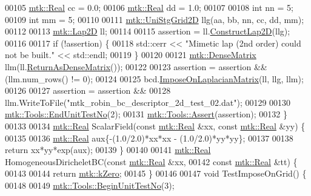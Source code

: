 \begin{DoxyCode}
00105   \hyperlink{group__c01-roots_gac080bbbf5cbb5502c9f00405f894857d}{mtk::Real} cc = 0.0;
00106   \hyperlink{group__c01-roots_gac080bbbf5cbb5502c9f00405f894857d}{mtk::Real} dd = 1.0;
00107 
00108   \textcolor{keywordtype}{int} nn = 5;
00109   \textcolor{keywordtype}{int} mm = 5;
00110 
00111   \hyperlink{classmtk_1_1UniStgGrid2D}{mtk::UniStgGrid2D} llg(aa, bb, nn, cc, dd, mm);
00112 
00113   \hyperlink{classmtk_1_1Lap2D}{mtk::Lap2D} ll;
00114 
00115   assertion = ll.\hyperlink{classmtk_1_1Lap2D_a188ee8fee643463affca7de2884711b1}{ConstructLap2D}(llg);
00116 
00117   \textcolor{keywordflow}{if} (!assertion) \{
00118     std::cerr << \textcolor{stringliteral}{"Mimetic lap (2nd order) could not be built."} << std::endl;
00119   \}
00120 
00121   \hyperlink{classmtk_1_1DenseMatrix}{mtk::DenseMatrix} llm(ll.\hyperlink{classmtk_1_1Lap2D_aaac0a22eaa2f036869b24fd420ce5761}{ReturnAsDenseMatrix}());
00122 
00123   assertion = assertion && (llm.num\_rows() != 0);
00124 
00125   bcd.\hyperlink{classmtk_1_1RobinBCDescriptor2D_a0a26693f5265fcad978e7ba84e01ed69}{ImposeOnLaplacianMatrix}(ll, llg, llm);
00126 
00127   assertion = assertion &&
00128     llm.WriteToFile(\textcolor{stringliteral}{"mtk\_robin\_bc\_descriptor\_2d\_test\_02.dat"});
00129 
00130   \hyperlink{classmtk_1_1Tools_aba67d9dc35c9c1c49430fcc9ea035e03}{mtk::Tools::EndUnitTestNo}(2);
00131   \hyperlink{classmtk_1_1Tools_ac6804df469c94ab6a796fb64f1e44a89}{mtk::Tools::Assert}(assertion);
00132 \}
00133 
00134 \hyperlink{group__c01-roots_gac080bbbf5cbb5502c9f00405f894857d}{mtk::Real} ScalarField(\textcolor{keyword}{const} \hyperlink{group__c01-roots_gac080bbbf5cbb5502c9f00405f894857d}{mtk::Real} &xx, \textcolor{keyword}{const} \hyperlink{group__c01-roots_gac080bbbf5cbb5502c9f00405f894857d}{mtk::Real} &yy) \{
00135 
00136   \hyperlink{group__c01-roots_gac080bbbf5cbb5502c9f00405f894857d}{mtk::Real} aux\{-(1.0/2.0)*xx*xx - (1.0/2.0)*yy*yy\};
00137 
00138   \textcolor{keywordflow}{return} xx*yy*exp(aux);
00139 \}
00140 
00141 \hyperlink{group__c01-roots_gac080bbbf5cbb5502c9f00405f894857d}{mtk::Real} HomogeneousDiricheletBC(\textcolor{keyword}{const} \hyperlink{group__c01-roots_gac080bbbf5cbb5502c9f00405f894857d}{mtk::Real} &xx,
00142                                   \textcolor{keyword}{const} \hyperlink{group__c01-roots_gac080bbbf5cbb5502c9f00405f894857d}{mtk::Real} &tt) \{
00143 
00144   \textcolor{keywordflow}{return} \hyperlink{group__c01-roots_ga59a451a5fae30d59649bcda274fea271}{mtk::kZero};
00145 \}
00146 
00147 \textcolor{keywordtype}{void} TestImposeOnGrid() \{
00148 
00149   \hyperlink{classmtk_1_1Tools_afc29ecaf337a13ed2e817d3890a5a441}{mtk::Tools::BeginUnitTestNo}(3);

\end{DoxyCode}
